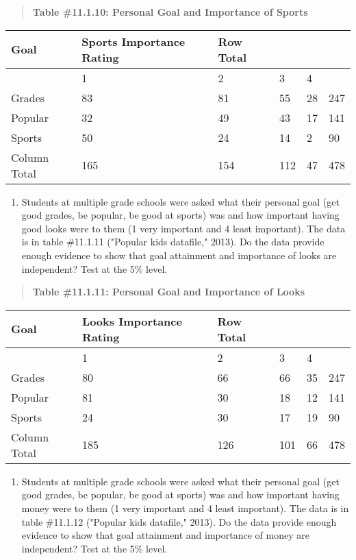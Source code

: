 \documentclass[]{book}
\providecommand{\tightlist}{%
  \setlength{\itemsep}{0pt}\setlength{\parskip}{0pt}}
\begin{document}
\begin{quote}
\textbf{Table \#11.1.10: Personal Goal and Importance of Sports}
\end{quote}

\begin{longtable}[]{@{}llllll@{}}
\toprule
Goal & Sports Importance Rating & Row Total & & &\tabularnewline
\midrule
\endhead
& 1 & 2 & 3 & 4 &\tabularnewline
Grades & 83 & 81 & 55 & 28 & 247\tabularnewline
Popular & 32 & 49 & 43 & 17 & 141\tabularnewline
Sports & 50 & 24 & 14 & 2 & 90\tabularnewline
Column Total & 165 & 154 & 112 & 47 & 478\tabularnewline
\bottomrule
\end{longtable}

\begin{enumerate}
\def\labelenumi{\arabic{enumi}.}
\setcounter{enumi}{6}
\tightlist
\item
  Students at multiple grade schools were asked what their personal goal (get good grades, be popular, be good at sports) was and how important having good looks were to them (1 very important and 4 least important). The data is in table \#11.1.11 ("Popular kids datafile," 2013). Do the data provide enough evidence to show that goal attainment and importance of looks are independent? Test at the 5\% level.
\end{enumerate}

\begin{quote}
\textbf{Table \#11.1.11: Personal Goal and Importance of Looks}
\end{quote}

\begin{longtable}[]{@{}llllll@{}}
\toprule
Goal & Looks Importance Rating & Row Total & & &\tabularnewline
\midrule
\endhead
& 1 & 2 & 3 & 4 &\tabularnewline
Grades & 80 & 66 & 66 & 35 & 247\tabularnewline
Popular & 81 & 30 & 18 & 12 & 141\tabularnewline
Sports & 24 & 30 & 17 & 19 & 90\tabularnewline
Column Total & 185 & 126 & 101 & 66 & 478\tabularnewline
\bottomrule
\end{longtable}

\begin{enumerate}
\def\labelenumi{\arabic{enumi}.}
\setcounter{enumi}{7}
\tightlist
\item
  Students at multiple grade schools were asked what their personal goal (get good grades, be popular, be good at sports) was and how important having money were to them (1 very important and 4 least important). The data is in table \#11.1.12 ("Popular kids datafile," 2013). Do the data provide enough evidence to show that goal attainment and importance of money are independent? Test at the 5\% level.
\end{enumerate}
\end{document}

